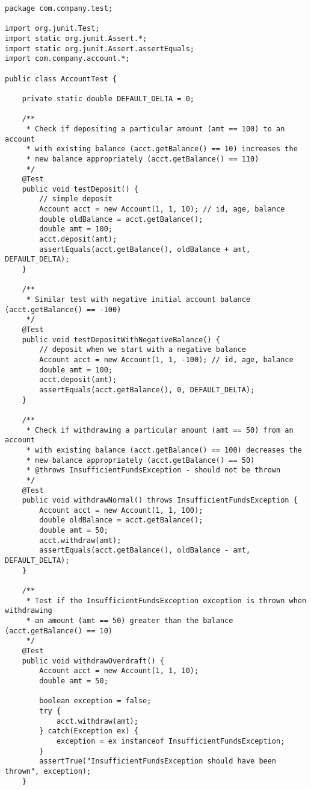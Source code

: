 \documentclass{article}
\begin{document}
\begin{lstlisting}
package com.company.test;

import org.junit.Test;
import static org.junit.Assert.*;
import static org.junit.Assert.assertEquals;
import com.company.account.*;

public class AccountTest {

    private static double DEFAULT_DELTA = 0;

    /**
     * Check if depositing a particular amount (amt == 100) to an account 
     * with existing balance (acct.getBalance() == 10) increases the 
     * new balance appropriately (acct.getBalance() == 110)
     */
    @Test
    public void testDeposit() {
        // simple deposit
        Account acct = new Account(1, 1, 10); // id, age, balance
        double oldBalance = acct.getBalance();
        double amt = 100;
        acct.deposit(amt);
        assertEquals(acct.getBalance(), oldBalance + amt, DEFAULT_DELTA);
    }

    /**
     * Similar test with negative initial account balance (acct.getBalance() == -100)
     */
    @Test
    public void testDepositWithNegativeBalance() {
        // deposit when we start with a negative balance
        Account acct = new Account(1, 1, -100); // id, age, balance
        double amt = 100;
        acct.deposit(amt);
        assertEquals(acct.getBalance(), 0, DEFAULT_DELTA);
    }

    /**
     * Check if withdrawing a particular amount (amt == 50) from an account 
     * with existing balance (acct.getBalance() == 100) decreases the 
     * new balance appropriately (acct.getBalance() == 50)
     * @throws InsufficientFundsException - should not be thrown
     */
    @Test
    public void withdrawNormal() throws InsufficientFundsException {
        Account acct = new Account(1, 1, 100);
        double oldBalance = acct.getBalance();
        double amt = 50;
        acct.withdraw(amt);
        assertEquals(acct.getBalance(), oldBalance - amt, DEFAULT_DELTA);
    }

    /**
     * Test if the InsufficientFundsException exception is thrown when withdrawing
     * an amount (amt == 50) greater than the balance (acct.getBalance() == 10)
     */
    @Test
    public void withdrawOverdraft() {
        Account acct = new Account(1, 1, 10);
        double amt = 50;

        boolean exception = false;
        try {
            acct.withdraw(amt);
        } catch(Exception ex) {
            exception = ex instanceof InsufficientFundsException;
        }
        assertTrue("InsufficientFundsException should have been thrown", exception);
    }


\end{lstlisting}
\end{document}
